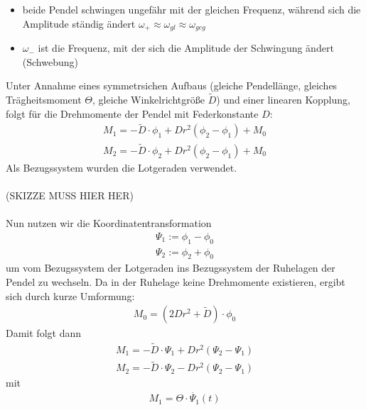 \documentclass[a4paper,10pt]{scrartcl}
\begin{document}
\begin{itemize}
\begin{itemize}
					\begin{itemize}
						\item beide Pendel schwingen ungefähr mit der gleichen Frequenz, während sich die Amplitude ständig ändert \(\omega_{+}\approx \omega_{gl}\approx \omega_{geg}\) 
						\item \(\omega_{-}\) ist die Frequenz, mit der sich die Amplitude der Schwingung ändert (Schwebung)
					\end{itemize}
					Unter Annahme eines symmetrsichen Aufbaus (gleiche Pendellänge, gleiches Trägheitsmoment \(\Theta\), gleiche Winkelrichtgröße \(\tilde{D}\)) und einer linearen Kopplung, folgt für die Drehmomente der Pendel mit Federkonstante \(D\):
					\begin{align}
					M_{1}=-\tilde{D}\cdot \phi_{1}+Dr^{2}(\phi_{2}-\phi_{1})+M_{0}
					\end{align}
					\begin{align}
					M_{2}=-\tilde{D}\cdot \phi_{2}+Dr^{2}(\phi_{2}-\phi_{1})+M_{0}
					\end{align}
					Als Bezugssystem wurden die Lotgeraden verwendet.\\
					\\
					(SKIZZE MUSS HIER HER)\\
					\\
					Nun nutzen wir die Koordinatentransformation
					\begin{align*}
					\Psi_{1}:=\phi_{1}-\phi_{0}
					\end{align*}
					\begin{align*}
					\Psi_{2}:=\phi_{2}+\phi_{0}
					\end{align*}
					um vom Bezugssystem der Lotgeraden ins Bezugssystem der Ruhelagen der Pendel zu wechseln. Da in der Ruhelage keine Drehmomente existieren, ergibt sich durch kurze Umformung:
					\begin{align}
					M_{0}=(2Dr^{2}+\tilde{D})\cdot \phi_{0}
					\end{align} 
					Damit folgt dann 
					\begin{align}
					M_{1}=-\tilde{D}\cdot \Psi_{1}+Dr^{2}(\Psi_{2}-\Psi_{1})
					\end{align}
					\begin{align}
					M_{2}=-\tilde{D}\cdot \Psi_{2}-Dr^{2}(\Psi_{2}-\Psi_{1})
					\end{align}
					mit 
					\begin{align*}
					M_{1}=\Theta\cdot \ddot{\Psi_{1}}(t)
					\end{align*}
					\begin{align*}

\end{align*}
\end{itemize}
\end{itemize}
\end{document}
